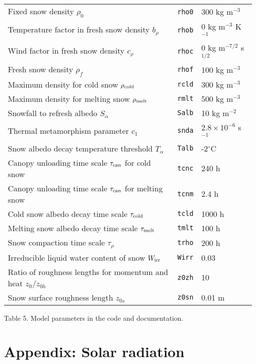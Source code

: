 \documentclass{article}
\begin{document}
\begin{tabular}{|l|l|l|}
Fixed snow density $\rho_0$ & {\tt rho0}           & 300 kg m$^{-3}$ \\
Temperature factor in fresh snow density $b _\rho$ & {\tt rhob} & 0 kg m$^{-3}$ K$^{-1}$ \\
Wind factor in fresh snow density $c_\rho$       & {\tt rhoc} & 0 kg m$^{-7/2}$ s$^{1/2}$\\
Fresh snow density $\rho_f$ & {\tt rhof}           & 100 kg m$^{-3}$ \\
Maximum density for cold snow $\rho_{\rm cold}$    & {\tt rcld} & 300 kg m$^{-3}$ \\
Maximum density for melting snow $\rho_{\rm melt}$ & {\tt rmlt} & 500 kg m$^{-3}$ \\
Snowfall to refresh albedo $S_\alpha$ & {\tt Salb} & 10 kg m$^{-2}$ \\
Thermal metamorphism parameter $c_1$ & {\tt snda}  & $2.8 \times 10^{-6}$ s$^{-1}$ \\
Snow albedo decay temperature threshold $T_\alpha$ & {\tt Talb} & -2$^\circ$C \\
Canopy unloading time scale $\tau_{\rm can}$ for cold snow & {\tt tcnc} & 240 h \\
Canopy unloading time scale $\tau_{\rm can}$ for melting snow & {\tt tcnm} & 2.4 h \\
Cold snow albedo decay time scale $\tau_{\rm cold}$ & {\tt tcld} & 1000 h \\
Melting snow albedo decay time scale $\tau_{\rm melt}$ & {\tt tmlt} & 100 h \\
Snow compaction time scale $\tau_\rho$ & {\tt trho} & 200 h \\
Irreducible liquid water content of snow $W_{\rm irr}$ & {\tt Wirr} & 0.03 \\
Ratio of roughness lengths for momentum and heat $z_0/z_{0h}$ & {\tt z0zh} & 10 \\
Snow surface roughness length $z_{0s}$ & {\tt z0sn} & 0.01 m \\
\hline
\end{tabular}

Table 5. Model parameters in the code and documentation.

\section*{Appendix: Solar radiation}
\end{document}
